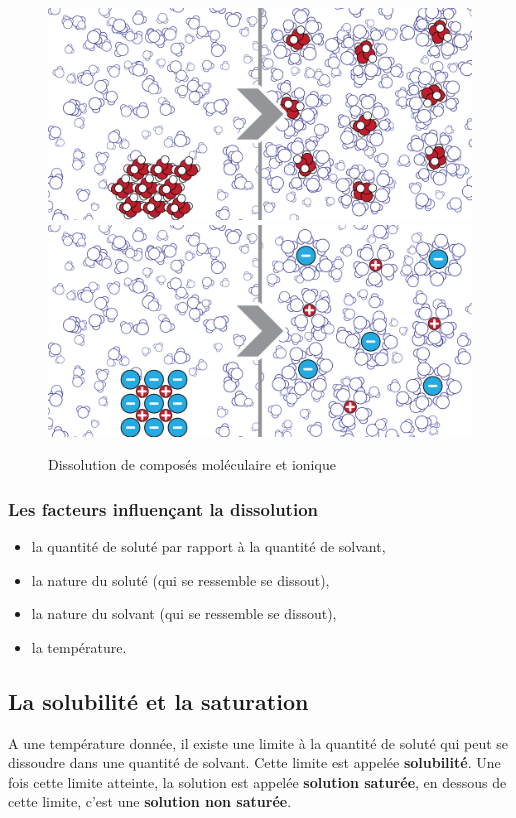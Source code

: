 \documentclass[
  11pt,
  a4paper,
  openany]{book}
\providecommand{\tightlist}{%
  \setlength{\itemsep}{0pt}\setlength{\parskip}{0pt}}
\begin{document}
\begin{figure}

{\centering \includegraphics[width=0.45\linewidth]{images/dissolution-1} \includegraphics[width=0.45\linewidth]{images/dissolution-2} 

}

\caption{Dissolution de composés moléculaire et ionique}\label{fig:ionique-moleculaire}
\end{figure}

\hypertarget{les-facteurs-influenuxe7ant-la-dissolution}{%
\subsubsection{Les facteurs influençant la dissolution}\label{les-facteurs-influenuxe7ant-la-dissolution}}

\begin{itemize}
\tightlist
\item
  la quantité de soluté par rapport à la quantité de solvant,
\item
  la nature du soluté (qui se ressemble se dissout),
\item
  la nature du solvant (qui se ressemble se dissout),
\item
  la température.
\end{itemize}

\hypertarget{la-solubilituxe9-et-la-saturation}{%
\subsection{La solubilité et la saturation}\label{la-solubilituxe9-et-la-saturation}}

A une température donnée, il existe une limite à la quantité de soluté qui peut se dissoudre dans une quantité de solvant. Cette limite est appelée \textbf{solubilité}. Une fois cette limite atteinte, la solution est appelée \textbf{solution saturée}, en dessous de cette limite, c'est une \textbf{solution non saturée}.
\end{document}
